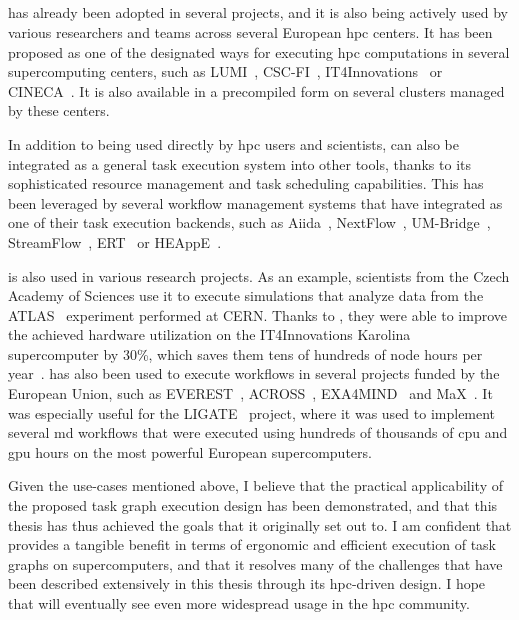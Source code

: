 \subsection*{\hyperqueue{}}
\hyperqueue{} has already been adopted in several projects, and it is also being
actively used by various researchers and teams across several European \gls{hpc}
centers. It has been proposed as one of the designated ways for executing
\gls{hpc} computations in several supercomputing centers, such as
LUMI~\cite{it4i-lumi}, CSC-FI~\cite{puhti-hq,puhti-hq-2},
IT4Innovations~\cite{it4i-hq} or CINECA~\cite{cineca}. It is also available in a precompiled
form on several clusters managed by these centers.

In addition to being used directly by \gls{hpc} users and scientists,
\hyperqueue{} can also be integrated as a general task execution system into other
tools, thanks to its sophisticated resource management and task scheduling capabilities. This has
been leveraged by several workflow management systems that have integrated
\hyperqueue{} as one of their task execution backends, such as
Aiida~\cite{aiida-hq}, NextFlow~\cite{nextflow-hq},
UM-Bridge~\cite{umbridge}, StreamFlow~\cite{streamflow-hq},
ERT~\cite{ert} or HEAppE~\cite{heappe}.

\hyperqueue{} is also used in various research projects. As an example,
scientists from the Czech Academy of Sciences use it to execute simulations that analyze data from
the ATLAS~\cite{atlas} experiment performed at CERN. Thanks to
\hyperqueue{}, they were able to improve the achieved hardware utilization on the
IT4Innovations Karolina~\cite{karolina} supercomputer by 30\%, which saves them tens of
hundreds of node hours per year~\cite{cern-hq}. \hyperqueue{} has also
been used to execute workflows in several projects funded by the European Union, such as
EVEREST~\cite{everest}, ACROSS~\cite{across},
EXA4MIND~\cite{exa4mind} and MaX~\cite{max}. It was especially useful
for the LIGATE~\cite{ligate} project, where it was used to implement several
\gls{md} workflows that were executed using hundreds of thousands of
\gls{cpu} and \gls{gpu} hours on the most powerful European
supercomputers.

Given the use-cases mentioned above, I believe that the practical applicability of the proposed
task graph execution design has been demonstrated, and that this thesis has thus achieved the goals
that it originally set out to. I am confident that \hyperqueue{} provides a tangible
benefit in terms of ergonomic and efficient execution of task graphs on supercomputers, and that it
resolves many of the challenges that have been described extensively in this thesis through its
\gls{hpc}-driven design. I hope that \hyperqueue{} will eventually
see even more widespread usage in the \gls{hpc} community.
